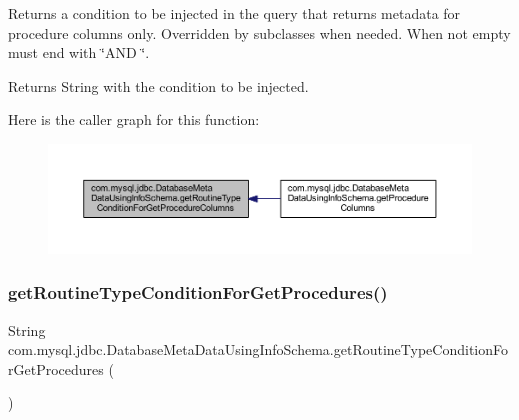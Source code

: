 Returns a condition to be injected in the query that returns metadata for procedure columns only. Overridden by subclasses when needed. When not empty must end with \char`\"{}\+A\+N\+D \char`\"{}.

\begin{DoxyReturn}{Returns}
String with the condition to be injected. 
\end{DoxyReturn}
Here is the caller graph for this function\+:
\nopagebreak
\begin{figure}[H]
\begin{center}
\leavevmode
\includegraphics[width=350pt]{classcom_1_1mysql_1_1jdbc_1_1_database_meta_data_using_info_schema_a0ccd2f846e79fd6ef8d5f77c6200fb03_icgraph}
\end{center}
\end{figure}
\mbox{\label{classcom_1_1mysql_1_1jdbc_1_1_database_meta_data_using_info_schema_a78df26f7bd43db24e251d4b14560fe47}} 
\subsubsection{\texorpdfstring{get\+Routine\+Type\+Condition\+For\+Get\+Procedures()}{getRoutineTypeConditionForGetProcedures()}}
{\footnotesize\ttfamily String com.\+mysql.\+jdbc.\+Database\+Meta\+Data\+Using\+Info\+Schema.\+get\+Routine\+Type\+Condition\+For\+Get\+Procedures (\begin{DoxyParamCaption}{ }\end{DoxyParamCaption})\hspace{0.3cm}{\ttfamily [protected]}}

